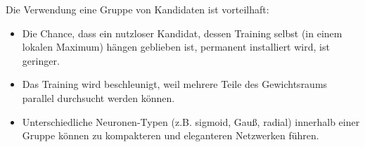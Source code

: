 Die Verwendung eine Gruppe von Kandidaten ist vorteilhaft:
\begin{itemize}
	\item Die Chance, dass ein nutzloser Kandidat, dessen Training selbst (in einem lokalen Maximum) hängen geblieben ist, permanent installiert wird, ist geringer.
	\item Das Training wird beschleunigt, weil mehrere Teile des Gewichtsraums parallel durchsucht werden können.
	\item Unterschiedliche Neuronen-Typen (z.B. sigmoid, Gauß, radial) innerhalb einer Gruppe können zu kompakteren und eleganteren Netzwerken führen.
\end{itemize}



